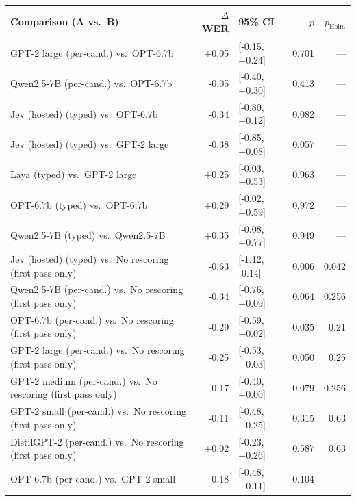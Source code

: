 \begin{tabular}{lrlrr}
\toprule
Comparison (A vs.\ B) & $\Delta$WER & 95\% CI & $p$ & $p_{\text{Holm}}$ \\
\midrule
GPT-2 large (per-cand.) vs.\ OPT-6.7b & +0.05 & [-0.15, +0.24] & 0.701 & --- \\
Qwen2.5-7B (per-cand.) vs.\ OPT-6.7b & -0.05 & [-0.40, +0.30] & 0.413 & --- \\
Jev (hosted) (typed) vs.\ OPT-6.7b & -0.34 & [-0.80, +0.12] & 0.082 & --- \\
Jev (hosted) (typed) vs.\ GPT-2 large & -0.38 & [-0.85, +0.08] & 0.057 & --- \\
Laya (typed) vs.\ GPT-2 large & +0.25 & [-0.03, +0.53] & 0.963 & --- \\
OPT-6.7b (typed) vs.\ OPT-6.7b & +0.29 & [-0.02, +0.59] & 0.972 & --- \\
Qwen2.5-7B (typed) vs.\ Qwen2.5-7B & +0.35 & [-0.08, +0.77] & 0.949 & --- \\
Jev (hosted) (typed) vs.\ No rescoring (first pass only) & -0.63 & [-1.12, -0.14] & 0.006 & 0.042 \\
Qwen2.5-7B (per-cand.) vs.\ No rescoring (first pass only) & -0.34 & [-0.76, +0.09] & 0.064 & 0.256 \\
OPT-6.7b (per-cand.) vs.\ No rescoring (first pass only) & -0.29 & [-0.59, +0.02] & 0.035 & 0.21 \\
GPT-2 large (per-cand.) vs.\ No rescoring (first pass only) & -0.25 & [-0.53, +0.03] & 0.050 & 0.25 \\
GPT-2 medium (per-cand.) vs.\ No rescoring (first pass only) & -0.17 & [-0.40, +0.06] & 0.079 & 0.256 \\
GPT-2 small (per-cand.) vs.\ No rescoring (first pass only) & -0.11 & [-0.48, +0.25] & 0.315 & 0.63 \\
DistilGPT-2 (per-cand.) vs.\ No rescoring (first pass only) & +0.02 & [-0.23, +0.26] & 0.587 & 0.63 \\
OPT-6.7b (per-cand.) vs.\ GPT-2 small & -0.18 & [-0.48, +0.11] & 0.104 & --- \\
\bottomrule
\end{tabular}
